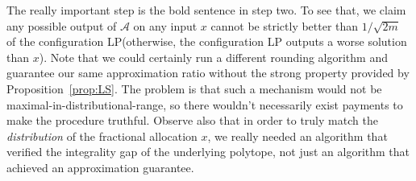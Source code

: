 The really important step is the bold sentence in step two. To see that, we claim any possible output of $\mathcal A$ on any input $x$ cannot be strictly better than $1/\sqrt{2m}$ of the configuration LP(otherwise, the configuration LP outputs a worse solution than $x$).  Note that we could certainly run a different rounding algorithm and guarantee our same approximation ratio without the strong property provided by Proposition~\ref{prop:LS}. The problem is that such a mechanism would not be maximal-in-distributional-range, so there wouldn't necessarily exist payments to make the procedure truthful. Observe also that in order to truly match the \emph{distribution} of the fractional allocation $x$, we really needed an algorithm that verified the integrality gap of the underlying polytope, not just an algorithm that achieved an approximation guarantee.






